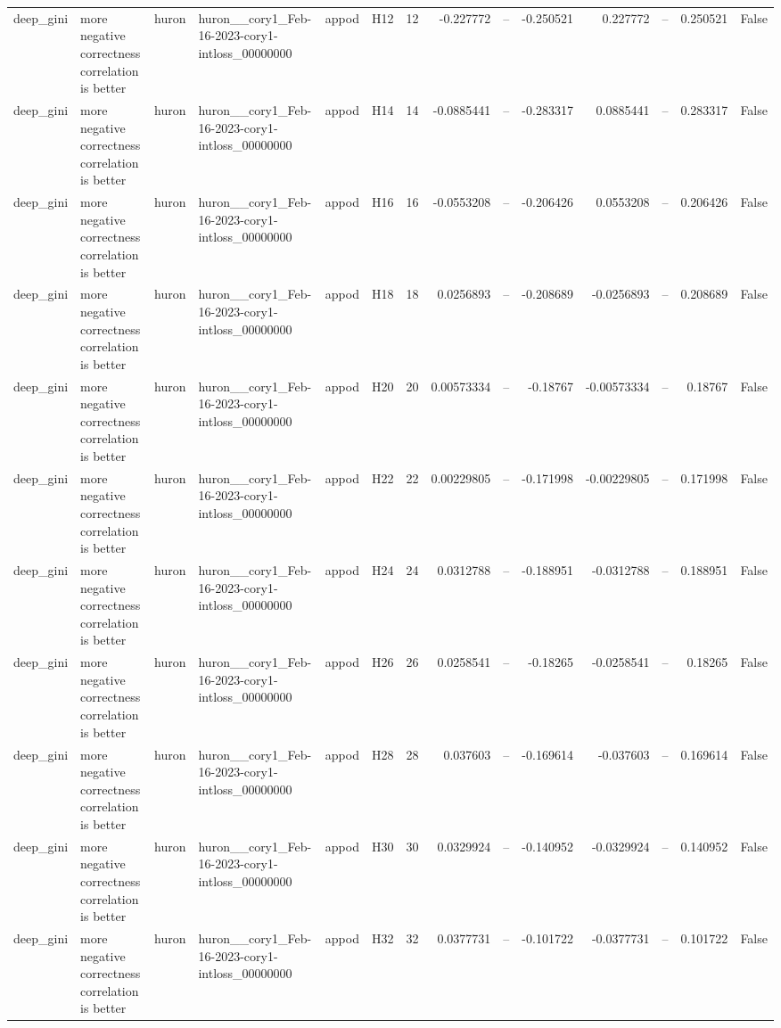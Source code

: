 \begin{longtable}{llllllrrrrrrrr}
deep\_gini & more negative correctness correlation is better & huron & huron\_\_cory1\_Feb-16-2023-cory1-intloss\_00000000 & appod & H12 & 12 & -0.227772 & -- & -0.250521 & 0.227772 & -- & 0.250521 & False \\
deep\_gini & more negative correctness correlation is better & huron & huron\_\_cory1\_Feb-16-2023-cory1-intloss\_00000000 & appod & H14 & 14 & -0.0885441 & -- & -0.283317 & 0.0885441 & -- & 0.283317 & False \\
deep\_gini & more negative correctness correlation is better & huron & huron\_\_cory1\_Feb-16-2023-cory1-intloss\_00000000 & appod & H16 & 16 & -0.0553208 & -- & -0.206426 & 0.0553208 & -- & 0.206426 & False \\
deep\_gini & more negative correctness correlation is better & huron & huron\_\_cory1\_Feb-16-2023-cory1-intloss\_00000000 & appod & H18 & 18 & 0.0256893 & -- & -0.208689 & -0.0256893 & -- & 0.208689 & False \\
deep\_gini & more negative correctness correlation is better & huron & huron\_\_cory1\_Feb-16-2023-cory1-intloss\_00000000 & appod & H20 & 20 & 0.00573334 & -- & -0.18767 & -0.00573334 & -- & 0.18767 & False \\
deep\_gini & more negative correctness correlation is better & huron & huron\_\_cory1\_Feb-16-2023-cory1-intloss\_00000000 & appod & H22 & 22 & 0.00229805 & -- & -0.171998 & -0.00229805 & -- & 0.171998 & False \\
deep\_gini & more negative correctness correlation is better & huron & huron\_\_cory1\_Feb-16-2023-cory1-intloss\_00000000 & appod & H24 & 24 & 0.0312788 & -- & -0.188951 & -0.0312788 & -- & 0.188951 & False \\
deep\_gini & more negative correctness correlation is better & huron & huron\_\_cory1\_Feb-16-2023-cory1-intloss\_00000000 & appod & H26 & 26 & 0.0258541 & -- & -0.18265 & -0.0258541 & -- & 0.18265 & False \\
deep\_gini & more negative correctness correlation is better & huron & huron\_\_cory1\_Feb-16-2023-cory1-intloss\_00000000 & appod & H28 & 28 & 0.037603 & -- & -0.169614 & -0.037603 & -- & 0.169614 & False \\
deep\_gini & more negative correctness correlation is better & huron & huron\_\_cory1\_Feb-16-2023-cory1-intloss\_00000000 & appod & H30 & 30 & 0.0329924 & -- & -0.140952 & -0.0329924 & -- & 0.140952 & False \\
deep\_gini & more negative correctness correlation is better & huron & huron\_\_cory1\_Feb-16-2023-cory1-intloss\_00000000 & appod & H32 & 32 & 0.0377731 & -- & -0.101722 & -0.0377731 & -- & 0.101722 & False \\

\end{longtable}
